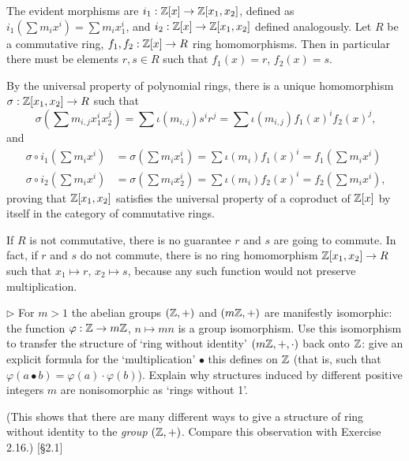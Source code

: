 \begin{solution}
	The evident morphisms are $i_1: \mathbb{Z}[x] \to \mathbb{Z}[x_1, x_2]$, defined as $i_1(\sum m_i x^i) = \sum m_i x_1^i$, and $i_2 : \mathbb{Z}[x] \to \mathbb{Z}[x_1, x_2]$ defined analogously. Let $R$ be a commutative ring, $f_1, f_2: \mathbb{Z}[x] \to R$ ring homomorphisms. Then in particular there must be elements $r, s \in R$ such that $f_1(x) = r$, $f_2(x) = s$.
	
	By the universal property of polynomial rings, there is a unique homomorphism $\sigma: \mathbb{Z}[x_1, x_2] \to R$ such that
	\[
		\sigma(\sum m_{i, j} x_1^i x_2^j) = \sum \iota(m_{i,j}) s^i r^j = \sum \iota(m_{i, j}) f_1(x)^i f_2(x)^j \text{,}
	\]
	and
	\begin{align*}
		\sigma \circ i_1(\sum m_i x^i) &= \sigma(\sum m_i x_1^i) = \sum \iota(m_i) f_1(x)^i = f_1(\sum m_i x^i) \\
		\sigma \circ i_2(\sum m_i x^i) &= \sigma(\sum m_i x_2^i) = \sum \iota(m_i) f_2(x)^i = f_2(\sum m_i x^i) \text{,}
	\end{align*}
	proving that $\mathbb{Z}[x_1, x_2]$ satisfies the universal property of a coproduct of $\mathbb{Z}[x]$ by itself in the category of commutative rings.
	
	If $R$ is not commutative, there is no guarantee $r$ and $s$ are going to commute. In fact, if $r$ and $s$ do not commute, there is no ring homomorphism $\mathbb{Z}[x_1, x_2] \to R$ such that $x_1 \mapsto r$, $x_2 \mapsto s$, because any such function would not preserve multiplication.
\end{solution}

\begin{problem}
	$\triangleright$ For $m > 1$ the abelian groups $(\mathbb{Z}, +)$ and $(m\mathbb{Z}, +)$ are manifestly isomorphic: the function $\varphi: \mathbb{Z} \to m\mathbb{Z}$, $n \mapsto mn$ is a group isomorphism. Use this isomorphism to transfer the structure of `ring without identity' $(m\mathbb{Z}, +, \cdot)$ back onto $\mathbb{Z}$: give an explicit formula for the `multiplication' $\bullet$ this defines on $\mathbb{Z}$ (that is, such that $\varphi(a \bullet b) = \varphi(a) \cdot \varphi(b)$). Explain why structures induced by different positive integers $m$ are nonisomorphic as `rings without 1'.
	
	(This shows that there are many different ways to give a structure of ring without identity to the \emph{group} $(\mathbb{Z}, +)$. Compare this observation with Exercise 2.16.) [\S 2.1]
\end{problem}

